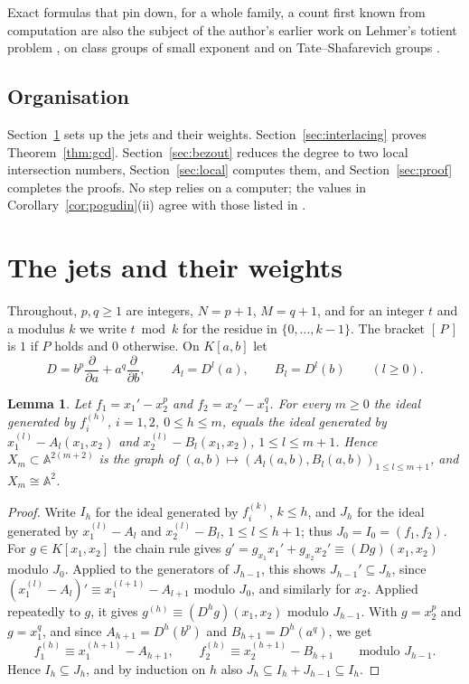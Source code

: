 \documentclass[11pt]{amsart}
\newtheorem{lemma}[theorem]{Lemma}
\theoremstyle{definition}
\theoremstyle{remark}
\numberwithin{equation}{section}
\newcommand{\A}{\mathbb{A}}
\newcommand{\ind}[1]{[\,#1\,]}
\begin{document}
Exact formulas that pin down, for a whole family, a count first known from computation are also the subject of the author's earlier work on Lehmer's totient problem \cite{BhaLehmer}, on class groups of small exponent \cite{BhaClass} and on Tate--Shafarevich groups \cite{BhaBSD}.

\subsection*{Organisation}
Section~\ref{sec:jets} sets up the jets and their weights. Section~\ref{sec:interlacing} proves Theorem~\ref{thm:gcd}. Section~\ref{sec:bezout} reduces the degree to two local intersection numbers, Section~\ref{sec:local} computes them, and Section~\ref{sec:proof} completes the proofs. No step relies on a computer; the values in Corollary~\ref{cor:pogudin}(ii) agree with those listed in \cite{Pog25}.

\section{The jets and their weights}\label{sec:jets}

Throughout, $p,q\ge1$ are integers, $N=p+1$, $M=q+1$, and for an integer $t$ and a modulus $k$ we write $t\bmod k$ for the residue in $\{0,\dots,k-1\}$. The bracket $\ind{P}$ is $1$ if $P$ holds and $0$ otherwise. On $K[a,b]$ let
\[
D=b^p\frac{\partial}{\partial a}+a^q\frac{\partial}{\partial b},\qquad A_l=D^l(a),\qquad B_l=D^l(b)\qquad(l\ge0).
\]

\begin{lemma}\label{lem:graph}
Let $f_1=x_1'-x_2^p$ and $f_2=x_2'-x_1^q$. For every $m\ge0$ the ideal generated by $f_i^{(h)}$, $i=1,2$, $0\le h\le m$, equals the ideal generated by $x_1^{(l)}-A_l(x_1,x_2)$ and $x_2^{(l)}-B_l(x_1,x_2)$, $1\le l\le m+1$. Hence $X_m\subset\A^{2(m+2)}$ is the graph of $(a,b)\mapsto(A_l(a,b),B_l(a,b))_{1\le l\le m+1}$, and $X_m\cong\A^2$.
\end{lemma}

\begin{proof}
Write $I_h$ for the ideal generated by $f_i^{(k)}$, $k\le h$, and $J_h$ for the ideal generated by $x_1^{(l)}-A_l$ and $x_2^{(l)}-B_l$, $1\le l\le h+1$; thus $J_0=I_0=(f_1,f_2)$. For $g\in K[x_1,x_2]$ the chain rule gives $g'=g_{x_1}x_1'+g_{x_2}x_2'\equiv(Dg)(x_1,x_2)$ modulo $J_0$. Applied to the generators of $J_{h-1}$, this shows $J_{h-1}'\subseteq J_h$, since $(x_1^{(l)}-A_l)'\equiv x_1^{(l+1)}-A_{l+1}$ modulo $J_0$, and similarly for $x_2$. Applied repeatedly to $g$, it gives $g^{(h)}\equiv(D^hg)(x_1,x_2)$ modulo $J_{h-1}$. With $g=x_2^p$ and $g=x_1^q$, and since $A_{h+1}=D^h(b^p)$ and $B_{h+1}=D^h(a^q)$, we get
\[
f_1^{(h)}\equiv x_1^{(h+1)}-A_{h+1},\qquad f_2^{(h)}\equiv x_2^{(h+1)}-B_{h+1}\qquad\text{modulo }J_{h-1}.
\]
Hence $I_h\subseteq J_h$, and by induction on $h$ also $J_h\subseteq I_h+J_{h-1}\subseteq I_h$.
\end{proof}
\end{document}

